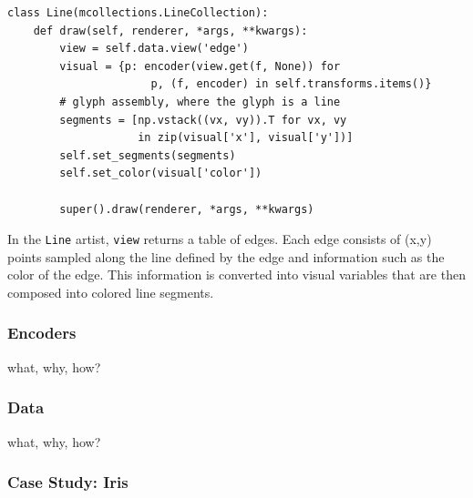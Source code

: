 \documentclass[../main.tex]{subfiles}
\begin{document}
\begin{verbatim}
class Line(mcollections.LineCollection):
    def draw(self, renderer, *args, **kwargs):
        view = self.data.view('edge')
        visual = {p: encoder(view.get(f, None)) for 
                      p, (f, encoder) in self.transforms.items()}
        # glyph assembly, where the glyph is a line
        segments = [np.vstack((vx, vy)).T for vx, vy 
                    in zip(visual['x'], visual['y'])]
        self.set_segments(segments)
        self.set_color(visual['color'])

        super().draw(renderer, *args, **kwargs)
\end{verbatim}
In the \texttt{Line} artist, \texttt{view} returns a table of edges. Each edge consists of (x,y) points sampled along the line defined by the edge and information such as the color of the edge. This information is converted into visual variables that are then composed into colored line segments. 

\subsubsection{Encoders \vchannel}
what, why, how?
\subsubsection{Data \dtotal}
what, why, how?

\subsubsection{Case Study: Iris}
\end{document}

